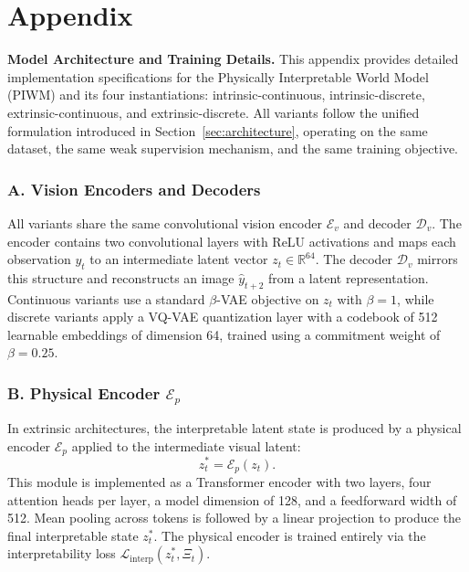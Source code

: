 \documentclass[nonacm,sigconf]{acmart}
\begin{document}






\newpage

\clearpage


\appendix
\section*{Appendix}

\textbf{Model Architecture and Training Details.} This appendix provides detailed implementation specifications for the Physically
Interpretable World Model (PIWM) and its four instantiations:
intrinsic-continuous, intrinsic-discrete, extrinsic-continuous, and
extrinsic-discrete. All variants follow the unified formulation introduced in
Section~\ref{sec:architecture}, operating on the same dataset, the same weak
supervision mechanism, and the same training objective.

\subsubsection*{A. Vision Encoders and Decoders}

All variants share the same convolutional vision encoder $\mathcal{E}_v$ and
decoder $\mathcal{D}_v$. The encoder contains two convolutional layers with ReLU
activations and maps each observation $y_t$ to an intermediate latent vector
$z_t \in \mathbb{R}^{64}$. The decoder $\mathcal{D}_v$ mirrors this structure
and reconstructs an image $\hat{y}_{t+2}$ from a latent representation.  
Continuous variants use a standard $\beta$-VAE objective on $z_t$ with
$\beta = 1$, while discrete variants apply a VQ-VAE quantization layer with a
codebook of 512 learnable embeddings of dimension 64, trained using a
commitment weight of $\beta = 0.25$.

\subsubsection*{B. Physical Encoder $\mathcal{E}_p$}

In extrinsic architectures, the interpretable latent state is produced by a
physical encoder $\mathcal{E}_p$ applied to the intermediate visual latent:
\[
z^*_t = \mathcal{E}_p(z_t).
\]
This module is implemented as a Transformer encoder with two layers, four
attention heads per layer, a model dimension of 128, and a feedforward width of
512. Mean pooling across tokens is followed by a linear projection to produce
the final interpretable state $z^*_t$. The physical encoder is trained entirely
via the interpretability loss $\mathcal{L}_{\text{interp}}(z^*_t, \Xi_t)$.
\end{document}
